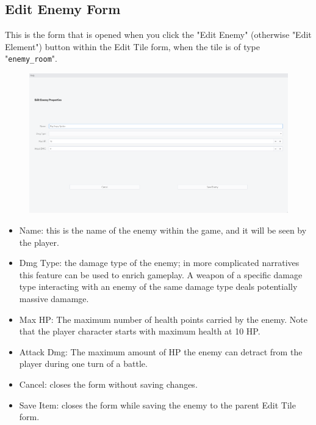\documentclass[class=article,crop=false]{standalone} \usepackage[margin=1in,headheight=57pt,headsep=0.1in]{geometry}
\begin{document}
\subsection{Edit Enemy Form}
This is the form that is opened when you click the "Edit Enemy" (otherwise "Edit Element") button within the Edit Tile form, when the tile is of type "\texttt{enemy\_room}".
\begin{figure}[H]
	\centering
	\includegraphics[width=1.0\textwidth]{./editEnemyForm.png}
\end{figure}
\begin{itemize}
	\item Name: this is the name of the enemy within the game, and it will be seen by the player.
	\item Dmg Type: the damage type of the enemy; in more complicated narratives this feature can be used to enrich gameplay. A weapon of a specific damage type interacting with an enemy of the same damage type deals potentially massive damamge.
	\item Max HP: The maximum number of health points carried by the enemy. Note that the player character starts with maximum health at 10 HP.
	\item Attack Dmg: The maximum amount of HP the enemy can detract from the player during one turn of a battle.
	\item Cancel: closes the form without saving changes.
	\item Save Item: closes the form while saving the enemy to the parent Edit Tile form.
\end{itemize}
\end{document}

